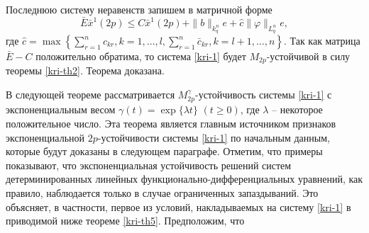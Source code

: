 Последнюю систему неравенств запишем в матричной форме
$$
\bar E\bar x^1 (2p) \leq C\bar x^1 (2p) + \|b\|_{k^n_{q}}e +
\hat c \|\varphi \|_{L^n_q} e,
$$
где $\hat c = \max \left\{ \sum \limits_{r=1}^{n}c_{kr}, k = 1, \dots
,l, \sum \limits_{r=1}^{n}\bar c_{kr}, k = l + 1, \dots ,n \right\}$.
Так как матрица  $\bar E - C$ положительно обратима, то система \eqref{kri-1}
будет $M_{2p}$-устойчивой в силу теоремы \ref{kri-th2}. Теорема доказана.

В следующей теореме рассматривается $M_{2p}^\gamma $-устойчивость
системы \eqref{kri-1} с экспоненциальным весом $\gamma (t) = \exp \{\lambda
t\} \,\, (t \geq 0)$, где $\lambda$ --  некоторое  положительное
число. Эта теорема является главным источником признаков
экспоненциальной $2p$-устойчивости системы \eqref{kri-1} по начальным данным,
которые будут доказаны в следующем параграфе. Отметим, что примеры
показывают, что экспоненциальная устойчивость решений систем
детерминированных линейных функционально-дифференциальных уравнений,
как правило,  наблюдается только в случае ограниченных запаздываний.
Это объясняет, в частности, первое из условий, накладываемых на
систему \eqref{kri-1} в приводимой ниже теореме \ref{kri-th5}. Предположим, что

